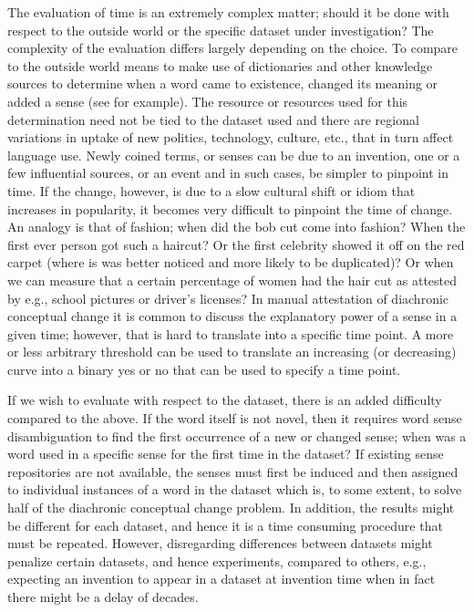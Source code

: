 \documentclass[output=paper]{langsci/langscibook}
\begin{document}
	The evaluation of time is an extremely complex matter; should it be done with respect to the outside world or the specific dataset under investigation? The complexity of the evaluation differs largely depending on the choice. To compare to the outside world means to make use of dictionaries and other knowledge sources to determine when a word came to existence, changed its meaning or added a sense (see \citealp{viola-frai.2020.00064} for example). The resource or resources used for this determination need not be tied to the dataset used and there are regional variations in uptake of new politics, technology, culture, etc., that in turn affect language use. 
    Newly coined terms, or senses can be due to an invention, one or a few influential sources, or an event and in such cases, be simpler to pinpoint in time. If the change, however, is due to a slow cultural shift or idiom that increases in popularity, it becomes very difficult to pinpoint the time of change. An analogy is that of fashion; when did the bob cut come into fashion? When the first ever person got such a haircut? Or the first celebrity showed it off on the red carpet (where is was better noticed and more likely to be duplicated)? Or when we can measure that a certain percentage of women had the hair cut as attested by e.g., school pictures or driver's licenses? In manual attestation of diachronic conceptual change it is common to discuss the explanatory power of a sense in a given time; however, that is hard to translate into a specific time point. A more or less arbitrary threshold can be used to translate an increasing (or decreasing) curve into a binary yes or no that can be used to specify a time point. 
    
    If we wish to evaluate with respect to the dataset, there is an added difficulty compared to the above. If the word itself is not novel, then it requires word sense disambiguation to find the first occurrence of a new or changed sense; when was a word used in a specific sense for the first time in the dataset?  If existing sense repositories are not available, the senses must first be induced and then assigned to individual instances of a word in the dataset which is, to some extent, to solve half of the diachronic conceptual change problem. In addition, the results might be different for each dataset, and hence it is a time consuming procedure that must be repeated. However, disregarding differences between datasets might penalize certain datasets, and hence experiments, compared to others, e.g., expecting an invention to appear in a dataset at invention time when in fact there might be a delay of  decades.  
\end{document}
